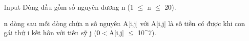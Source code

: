 Input
Dòng đầu gồm số nguyên dương n (1  $\le$  n  $\le$  20).  

   n dòng sau mỗi dòng chứa n số nguyên A[i,j] với A[i,j] là số tiền có được khi con gái thứ i kết hôn với tiến sỹ j (0$<$A[i,j] $\le$ 10^7).